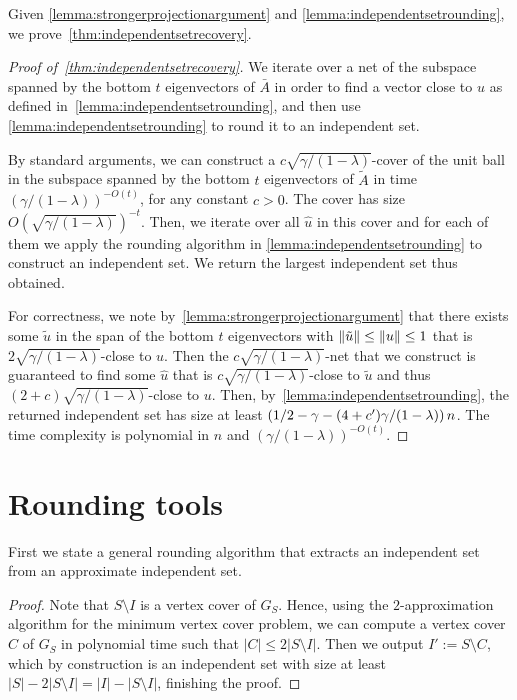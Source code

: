 Given \cref{lemma:strongerprojectionargument} and \cref{lemma:independentsetrounding}, we prove~\cref{thm:independentsetrecovery}.

\begin{proof}[Proof of~\cref{thm:independentsetrecovery}]
We iterate over a net of the subspace spanned by the bottom $t$ eigenvectors of $\bar{A}$ in order to find a vector close to $u$ as defined in~\cref{lemma:independentsetrounding}, and then use \cref{lemma:independentsetrounding} to round it to an independent set.

By standard arguments, we can construct a $c \sqrt{\gamma/(1-\lambda)}$-cover of the unit ball in the subspace spanned by the bottom $t$ eigenvectors of $\tilde{A}$ in time $(\gamma/(1-\lambda))^{-O(t)}$, for any constant $c > 0$.
The cover has size $O(\sqrt{\gamma/(1-\lambda)})^{-t}$.
Then, we iterate over all $\hat{u}$ in this cover and for each of them we apply the rounding algorithm in \cref{lemma:independentsetrounding} to construct an independent set.
We return the largest independent set thus obtained.

For correctness, we note by~\cref{lemma:strongerprojectionargument} that there exists some $\tilde{u}$ in the span of the bottom $t$ eigenvectors with $\lVert\tilde{u}\rVert \leq \lVert u\rVert \leq 1$ that is $2\sqrt{\gamma/(1-\lambda)}$-close to $u$.
Then the $c \sqrt{\gamma/(1-\lambda)}$-net that we construct is guaranteed to find some $\hat{u}$ that is $c \sqrt{\gamma/(1-\lambda)}$-close to $\tilde{u}$ and thus $(2+c)\sqrt{\gamma/(1-\lambda)}$-close to $u$.
Then, by~\cref{lemma:independentsetrounding}, the returned independent set has size at least $\left(1/2-\gamma - (4+c')\gamma/(1-\lambda)\right)n$. The time complexity is polynomial in $n$ and $(\gamma/(1-\lambda))^{-O(t)}$.
\end{proof}

\section{Rounding tools}

First we state a general rounding algorithm that extracts an independent set from an approximate independent set.

\begin{proof}
    Note that $S\setminus I$ is a vertex cover of $G_S$.
    Hence, using the $2$-approximation algorithm for the minimum vertex cover problem, we can compute a vertex cover $C$ of $G_S$ in polynomial time such that $|C| \leq 2|S \setminus I|$.
    Then we output $I':=S\setminus C$, which by construction is an independent set with size at least $|S| - 2|S \setminus I|=|I| - |S \setminus I|$, finishing the proof.
\end{proof}

